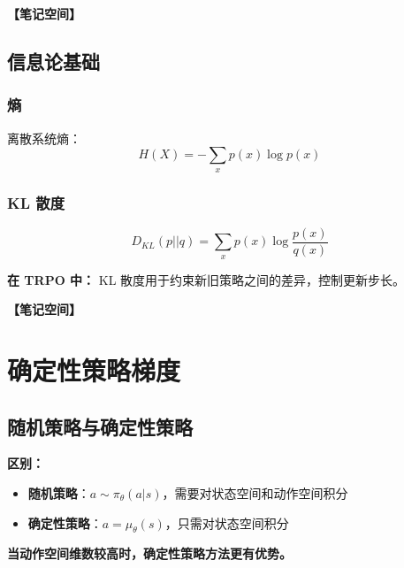 \documentclass[12pt,a4paper]{article}
\newcommand{\notespace}[1][3cm]{%
  \vspace{#1}%
  \noindent\textbf{【笔记空间】}%
  \vspace{#1}%
}
\newcommand{\1}{\mathbf{1}}
\begin{document}
\notespace[2cm]

\subsection{信息论基础}

\subsubsection*{熵}

离散系统熵：
\begin{equation}
H(X)=-\sum_x p(x)\log p(x)
\end{equation}

\subsubsection*{KL 散度}

\begin{equation}
D_{KL}(p||q)=\sum_x p(x)\log\frac{p(x)}{q(x)}
\end{equation}

\begin{notebox}
\textbf{在 TRPO 中：} KL 散度用于约束新旧策略之间的差异，控制更新步长。
\end{notebox}

\notespace[3cm]

\newpage

\section{确定性策略梯度}

\subsection{随机策略与确定性策略}

\begin{keybox}
\textbf{区别：}
\begin{itemize}[leftmargin=1.5em]
  \item \textbf{随机策略}：$a\sim\pi_\theta(a|s)$，需要对状态空间和动作空间积分
  \item \textbf{确定性策略}：$a=\mu_\theta(s)$，只需对状态空间积分
\end{itemize}
\textbf{当动作空间维数较高时，确定性策略方法更有优势。}
\end{keybox}
\end{document}
